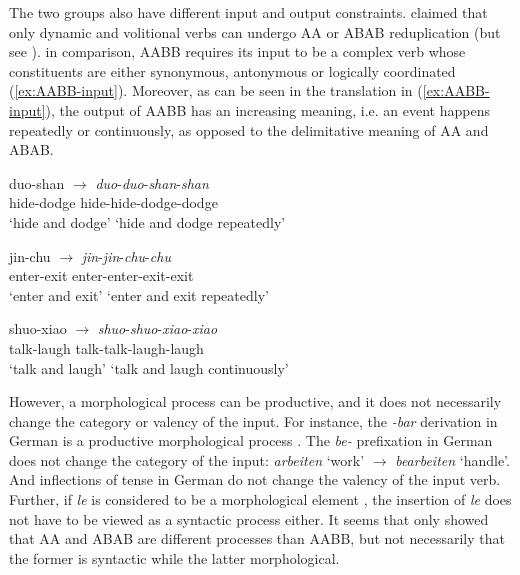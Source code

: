   \z
\z

The two groups also have different input and output constraints. \citet{Xie2020} claimed that only dynamic and volitional verbs can undergo AA or ABAB reduplication (but see ).
in comparison, AABB requires its input to be a complex verb whose constituents are either synonymous, antonymous or logically coordinated (\ref{ex:AABB-input}). 
Moreover, as can be seen in the translation in (\ref{ex:AABB-input}), the output of AABB has an increasing meaning, i.e. an event happens repeatedly or continuously, as opposed to the delimitative meaning of AA and ABAB.

\ea\label{ex:AABB-input}
  \ea \gll duo-shan $\rightarrow$ \textit{duo}-\textit{duo}-\textit{shan}-\textit{shan}\\
  hide-dodge {} hide-hide-dodge-dodge\\ 
  \glt `hide and dodge' `hide and dodge repeatedly'
  
  \ex \gll jin-chu $\rightarrow$ \textit{jin}-\textit{jin}-\textit{chu}-\textit{chu}\\
  enter-exit {} enter-enter-exit-exit\\ 
  \glt `enter and exit' `enter and exit repeatedly'
  
  \ex \gll shuo-xiao $\rightarrow$ \textit{shuo}-\textit{shuo}-\textit{xiao}-\textit{xiao}\\
  talk-laugh {} talk-talk-laugh-laugh\\ 
  \glt `talk and laugh' `talk and laugh continuously'
  \z
\z

However, a morphological process can be productive, and it does not necessarily change the category or valency of the input.
For instance, the \textit{-bar} derivation in German is a productive morphological process \citep[381]{Mueller2013}. 
The \textit{be-} prefixation in German does not change the category of the input: \textit{arbeiten} `work' $\rightarrow$ \textit{bearbeiten} `handle'. 
And inflections of tense in German do not change the valency of the input verb.
Further, if \textit{le} is considered to be a morphological element \citep[e.g.][]{Huangetal2009, MuellerLipenkova2013}, the insertion of \textit{le} does not have to be viewed as a syntactic
process either.
It seems that \citet{Xie2020} only showed that AA and ABAB are different processes than AABB, but not necessarily that the former is syntactic while the latter morphological.


